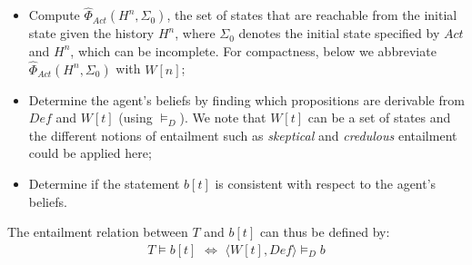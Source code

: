 \documentclass{article}
\newcommand{\memo}[1]{
  \ifthenelse {\boolean{includeMemo}}{\medskip\noindent\fbox{\begin{minipage}[b]{\dimexpr\linewidth-1em}#1\end{minipage}}\medskip\newline} 
}
\begin{document}
\begin{itemize}
\item Compute  $\hat\Phi_{Act}(H^n,\Sigma_0)$, the set of states that are reachable from the initial state given the history $H^n$,
where $\Sigma_0$ denotes the initial state specified by $Act$ and $H^n$, which can be incomplete. 
For compactness, below we abbreviate $\hat\Phi_{Act}(H^n,\Sigma_0)$ with $W[n]$;  

\item Determine  the agent's beliefs by finding which propositions are derivable from $\textit{Def}$ and $W[t]$ (using $\models_D$). We note that $W[t]$ can be a set of states and the different notions of entailment such as \emph{skeptical} and \emph{credulous} entailment could be applied here; 

\item Determine if the statement $b[t]$ is consistent with respect to the agent's beliefs. 
\end{itemize}  
%
%
The entailment relation between $T$ and $b[t]$ can thus be defined by:
%
\begin{align} 
T \models b[t] \,\,\Leftrightarrow\,\, \langle W[t], Def \rangle \models_D b \label{entail} 
\end{align} 
 
\end{document}
